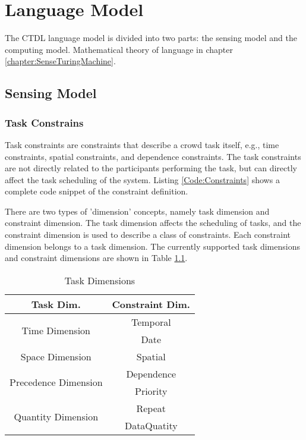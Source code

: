 \chapter{Language Model}
The CTDL language model is divided into two parts: the sensing model and the computing model. Mathematical theory of language in chapter \ref{chapter:SenseTuringMachine}.
\section{Sensing Model}

\subsection{Task Constrains}
Task constraints are constraints that describe a crowd task itself, e.g., time constraints, spatial constraints, and dependence constraints. The task constraints are not directly related to the participants performing the task, but can directly affect the task scheduling of the system. Listing \ref{Code:Constraints} shows a complete code snippet of the constraint definition.



There are two types of 'dimension' concepts, namely task dimension and constraint dimension. The task dimension affects the scheduling of tasks, and the constraint dimension is used to describe a class of constraints. Each constraint dimension belongs to a task dimension. The currently supported task dimensions and constraint dimensions are shown in Table \ref{tab:TaskDimensions}. 

\begin{table}[htbp]
\centering
\begin{tabular}{cc}
    \toprule
    Task Dim. & Constraint Dim. \\
    \midrule
    \multirow{2}{*}{Time Dimension}& Temporal  \\
    & Date \\
    Space Dimension & Spatial  \\
    \multirow{2}{*}{Precedence Dimension}& Dependence \\
    & Priority  \\
    \multirow{2}{*}{Quantity Dimension}& Repeat \\
    & DataQuatity \\
    \bottomrule
\end{tabular}
\caption{Task Dimensions}
\label{tab:TaskDimensions}
\end{table}


